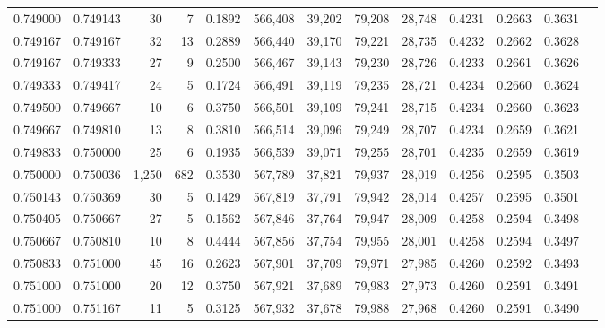 \begin{tabular}{rrrrrrrrrrrrr}
0.749000 & 0.749143 &    30 &   7 &                                     0.1892 & 566,408 &  39,202 &  79,208 &  28,748 & 0.4231 & 0.2663 & 0.3631 \\
0.749167 & 0.749167 &    32 &  13 &                                     0.2889 & 566,440 &  39,170 &  79,221 &  28,735 & 0.4232 & 0.2662 & 0.3628 \\
0.749167 & 0.749333 &    27 &   9 &                                     0.2500 & 566,467 &  39,143 &  79,230 &  28,726 & 0.4233 & 0.2661 & 0.3626 \\
0.749333 & 0.749417 &    24 &   5 &                                     0.1724 & 566,491 &  39,119 &  79,235 &  28,721 & 0.4234 & 0.2660 & 0.3624 \\
0.749500 & 0.749667 &    10 &   6 &                                     0.3750 & 566,501 &  39,109 &  79,241 &  28,715 & 0.4234 & 0.2660 & 0.3623 \\
0.749667 & 0.749810 &    13 &   8 &                                     0.3810 & 566,514 &  39,096 &  79,249 &  28,707 & 0.4234 & 0.2659 & 0.3621 \\
0.749833 & 0.750000 &    25 &   6 &                                     0.1935 & 566,539 &  39,071 &  79,255 &  28,701 & 0.4235 & 0.2659 & 0.3619 \\
0.750000 & 0.750036 & 1,250 & 682 &                                     0.3530 & 567,789 &  37,821 &  79,937 &  28,019 & 0.4256 & 0.2595 & 0.3503 \\
0.750143 & 0.750369 &    30 &   5 &                                     0.1429 & 567,819 &  37,791 &  79,942 &  28,014 & 0.4257 & 0.2595 & 0.3501 \\
0.750405 & 0.750667 &    27 &   5 &                                     0.1562 & 567,846 &  37,764 &  79,947 &  28,009 & 0.4258 & 0.2594 & 0.3498 \\
0.750667 & 0.750810 &    10 &   8 &                                     0.4444 & 567,856 &  37,754 &  79,955 &  28,001 & 0.4258 & 0.2594 & 0.3497 \\
0.750833 & 0.751000 &    45 &  16 &                                     0.2623 & 567,901 &  37,709 &  79,971 &  27,985 & 0.4260 & 0.2592 & 0.3493 \\
0.751000 & 0.751000 &    20 &  12 &                                     0.3750 & 567,921 &  37,689 &  79,983 &  27,973 & 0.4260 & 0.2591 & 0.3491 \\
0.751000 & 0.751167 &    11 &   5 &                                     0.3125 & 567,932 &  37,678 &  79,988 &  27,968 & 0.4260 & 0.2591 & 0.3490 \\

\end{tabular}
